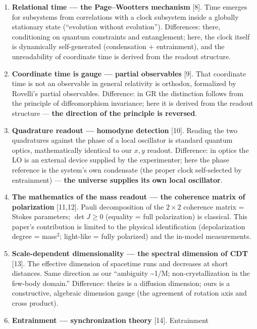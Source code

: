 \documentclass[
  a4paper,
]{article}
\providecommand{\tightlist}{%
  \setlength{\itemsep}{0pt}\setlength{\parskip}{0pt}}
\begin{document}
\begin{enumerate}
\def\labelenumi{\arabic{enumi}.}
\tightlist
\item
  \textbf{Relational time --- the Page--Wootters mechanism} {[}8{]}.
  Time emerges for subsystems from correlations with a clock subsystem
  inside a globally stationary state (``evolution without evolution'').
  Differences: there, conditioning on quantum constraints and
  entanglement; here, the clock itself is dynamically self-generated
  (condensation + entrainment), and the unreadability of coordinate time
  is derived from the readout structure.
\item
  \textbf{Coordinate time is gauge --- partial observables} {[}9{]}.
  That coordinate time is not an observable in general relativity is
  orthodox, formalized by Rovelli's partial observables. Difference: in
  GR the distinction follows from the principle of diffeomorphism
  invariance; here it is derived from the readout structure ---
  \textbf{the direction of the principle is reversed}.
\item
  \textbf{Quadrature readout --- homodyne detection} {[}10{]}. Reading
  the two quadratures against the phase of a local oscillator is
  standard quantum optics, mathematically identical to our \(x, y\)
  readout. Difference: in optics the LO is an external device supplied
  by the experimenter; here the phase reference is the system's own
  condensate (the proper clock self-selected by entrainment) ---
  \textbf{the universe supplies its own local oscillator}.
\item
  \textbf{The mathematics of the mass readout --- the coherence matrix
  of polarization} {[}11,12{]}. Pauli decomposition of the \(2\times2\)
  coherence matrix = Stokes parameters; \(\det J\ge0\) (equality = full
  polarization) is classical. This paper's contribution is limited to
  the physical identification (depolarization degree = mass\(^2\);
  light-like = fully polarized) and the in-model measurements.
\item
  \textbf{Scale-dependent dimensionality --- the spectral dimension of
  CDT} {[}13{]}. The effective dimension of spacetime runs and decreases
  at short distances. Same direction as our ``ambiguity
  \textasciitilde1/M; non-crystallization in the few-body domain.''
  Difference: theirs is a diffusion dimension; ours is a constructive,
  algebraic dimension gauge (the agreement of rotation axis and cross
  product).
\item
  \textbf{Entrainment --- synchronization theory} {[}14{]}. Entrainment

\end{enumerate}
\end{document}

